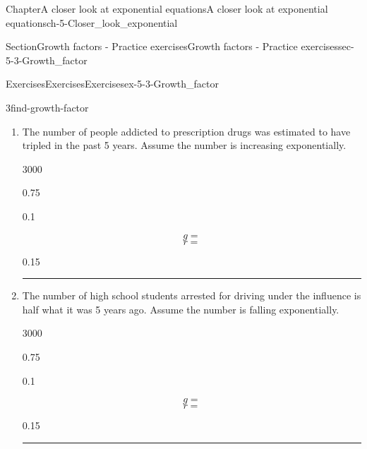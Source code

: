 \documentclass[twoside,11pt,]{book}
\newlength{\workspacestrutwidth}
\numberwithin{equation}{section}
\begin{document}
\begin{chapterptx}{Chapter}{A closer look at exponential equations}{}{A closer look at exponential equations}{}{}{ch-5-Closer_look_exponential}
\begin{sectionptx}{Section}{Growth factors - Practice exercises}{}{Growth factors - Practice exercises}{}{}{sec-5-3-Growth_factor}
\begin{exercises-subsection-numberless}{Exercises}{Exercises}{}{Exercises}{}{}{ex-5-3-Growth_factor}
\begin{divisionexercise}{3}{}{}{find-growth-factor}
\begin{enumerate}[label=(\alph*),ref=\alph*]
\begin{sidebyside}{3}{0}{0}{0}
\begin{sbspanel}{0.1}
\begin{equation*}
r =
\end{equation*}
%
\end{sbspanel}%
\begin{sbspanel}{0.15}%
\par
%
\end{sbspanel}%
\end{sidebyside}%
\par\rule{\workspacestrutwidth}{1.75cm}%
\item{}The number of people addicted to prescription drugs was estimated to have tripled in the past 5 years. Assume the number is increasing exponentially.%
\begin{sidebyside}{3}{0}{0}{0}%
\begin{sbspanel}{0.75}%
%
\end{sbspanel}%
\begin{sbspanel}{0.1}%
\par
%
\begin{equation*}
g=
\end{equation*}
%
\begin{equation*}
r =
\end{equation*}
%
\end{sbspanel}%
\begin{sbspanel}{0.15}%
\par
%
\end{sbspanel}%
\end{sidebyside}%
\par\rule{\workspacestrutwidth}{1.75cm}%
\item{}The number of high school students arrested for driving under the influence is half what it was 5 years ago. Assume the number is falling exponentially.%
\begin{sidebyside}{3}{0}{0}{0}%
\begin{sbspanel}{0.75}%
%
\end{sbspanel}%
\begin{sbspanel}{0.1}%
\par
%
\begin{equation*}
g=
\end{equation*}
%
\begin{equation*}
r =
\end{equation*}
%
\end{sbspanel}%
\begin{sbspanel}{0.15}%
\par
%
\end{sbspanel}%
\end{sidebyside}%
\par\rule{\workspacestrutwidth}{1.75cm}%

\end{enumerate}
\end{divisionexercise}
\end{exercises-subsection-numberless}
\end{sectionptx}
\end{chapterptx}
\end{document}
